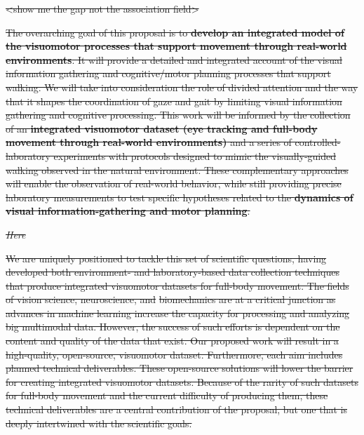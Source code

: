 \documentclass[
]{article}
\begin{document}
\st{\textless show me the gap not the association field\textgreater{}}

\st{The overarching goal of this proposal is to \textbf{develop an
integrated model of the visuomotor processes that support movement
through real-world environments}. It will provide a detailed and
integrated account of the visual information gathering and
cognitive/motor planning processes that support walking. We will take
into consideration the role of divided attention and the way that it
shapes the coordination of gaze and gait by limiting visual information
gathering and cognitive processing. This work will be informed by the
collection of an \textbf{integrated visuomotor dataset (eye tracking and
full-body movement through real-world environments)} and a series of
controlled-laboratory experiments with protocols designed to mimic the
visually-guided walking observed in the natural environment. These
complementary approaches will enable the observation of real-world
behavior, while still providing precise laboratory measurements to test
specific hypotheses related to the \textbf{dynamics of visual
information-gathering and motor planning}.}

\emph{\st{Here}}

\st{We are uniquely positioned to tackle this set of scientific
questions, having developed both environment- and laboratory-based data
collection techniques that produce integrated visuomotor datasets for
full-body movement. The fields of vision science, neuroscience, and}
\st{biomechanics are at a critical junction as advances in machine
learning increase the capacity for processing and analyzing big
multimodal data. However, the success of such efforts is dependent on
the content and quality of the data that exist. Our proposed work will
result in a high-quality, open-source, visuomotor dataset. Furthermore,
each aim includes planned technical deliverables. These open-source
solutions will lower the barrier for creating integrated visuomotor
datasets. Because of the rarity of such datasets for full-body movement
and the current difficulty of producing them, these technical
deliverables are a central contribution of the proposal, but one that is
deeply intertwined with the scientific goals.}
\end{document}
